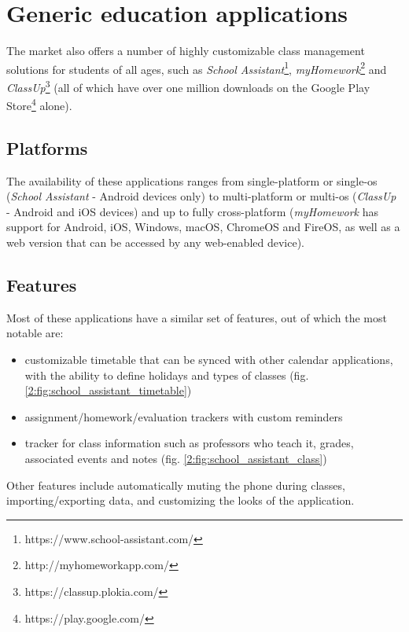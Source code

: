 \section{Generic education applications} \label{2:generic_apps}
    The market also offers a number of highly customizable class management solutions for students of all ages, such as \textit{School Assistant}\footnote{https://www.school-assistant.com/}, \textit{myHomework}\footnote{http://myhomeworkapp.com/} and \textit{ClassUp}\footnote{https://classup.plokia.com/} (all of which have over one million downloads on the Google Play Store\footnote{https://play.google.com/} alone).
    
    \subsection{Platforms} \label{2:generic_apps_platforms}
        The availability of these applications ranges from single-platform or single-\acrshort{os} (\textit{School Assistant} - Android devices only) to multi-platform or multi-\acrshort{os} (\textit{ClassUp} - Android and iOS devices) and up to fully cross-platform (\textit{myHomework} has support for Android, iOS, Windows, macOS, ChromeOS and FireOS, as well as a web version that can be accessed by any web-enabled device).
        
    \subsection{Features} \label{2:generic_apps_features}
        Most of these applications have a similar set of features, out of which the most notable are:
        
        \begin{itemize}
            \item customizable timetable that can be synced with other calendar applications, with the ability to define holidays and types of classes (fig. \ref{2:fig:school_assistant_timetable})
            \item assignment/homework/evaluation trackers with custom reminders
            \item tracker for class information such as professors who teach it, grades, associated events and notes (fig. \ref{2:fig:school_assistant_class})
        \end{itemize}
        
        Other features include automatically muting the phone during classes, importing/exporting data, and customizing the looks of the application.
        
